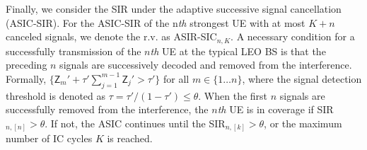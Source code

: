 \documentclass[lettersize,journal]{IEEEtran}
\begin{document}

Finally, we consider the SIR under the adaptive successive signal cancellation (ASIC-SIR). For the ASIC-SIR of the n\textit{th} strongest UE with at most $K+n$ canceled signals, we denote the r.v. as ASIR-SIC$_{n,K}$. A necessary condition for a successfully transmission of the $n$\textit{th} UE at the typical LEO BS is that the preceding $n$ signals are successively decoded and removed from the interference. Formally, $\{\mathsf{Z}_m'+\tau'\sum_{j=1}^{m-1}\mathsf{Z}_j'>\tau'\}$ for all $m \in \{1 \dots n\}$, where the signal detection threshold is denoted as $ \tau = \tau'/(1-\tau') \leq \theta$. When the first $n$ signals are successfully removed from the interference, the $n$\textit{th} UE is in coverage if SIR$_{n,[n]}>\theta$. If not, the ASIC continues until the SIR$_{n,[k]}>\theta$, or the maximum number of IC cycles $K$ is reached. %
\end{document}
